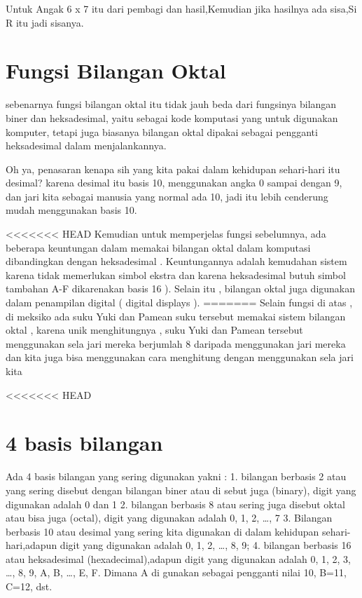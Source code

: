 Untuk Angak 6 x 7 itu dari pembagi dan hasil,Kemudian jika hasilnya ada sisa,Si R itu jadi sisanya.

\section{Fungsi Bilangan Oktal}

sebenarnya fungsi bilangan oktal itu tidak jauh beda dari fungsinya bilangan biner dan heksadesimal, yaitu sebagai kode komputasi yang untuk digunakan komputer, tetapi juga biasanya bilangan oktal dipakai sebagai pengganti heksadesimal dalam menjalankannya.

Oh ya, penasaran kenapa sih yang kita pakai dalam kehidupan sehari-hari itu desimal? karena desimal itu basis 10, menggunakan angka 0 sampai dengan 9, dan jari kita sebagai manusia yang normal ada 10, jadi itu lebih cenderung  mudah menggunakan basis 10.

<<<<<<< HEAD
Kemudian  untuk memperjelas fungsi sebelumnya, ada beberapa keuntungan dalam memakai bilangan oktal dalam komputasi dibandingkan dengan heksadesimal . Keuntungannya adalah kemudahan sistem karena tidak memerlukan simbol ekstra dan karena heksadesimal butuh simbol tambahan A-F dikarenakan basis 16 ). Selain itu , bilangan oktal juga digunakan dalam penampilan digital ( digital displays ).
=======
Selain fungsi di atas  , di meksiko ada suku Yuki dan Pamean suku tersebut memakai sistem bilangan oktal , karena unik menghitungnya , suku Yuki dan Pamean tersebut menggunakan sela jari mereka berjumlah 8 daripada menggunakan jari mereka dan kita juga bisa menggunakan cara menghitung dengan menggunakan sela jari kita 

<<<<<<< HEAD
\section{4 basis bilangan }

Ada 4 basis bilangan yang sering digunakan yakni :
1. bilangan berbasis 2 atau yang sering disebut dengan bilangan biner atau di sebut juga (binary), digit yang digunakan adalah 0 dan 1
2. bilangan berbasis 8 atau sering juga disebut oktal atau bisa juga (octal), digit yang digunakan adalah 0, 1, 2, …, 7
3. Bilangan berbasis 10 atau desimal yang sering kita digunakan di dalam kehidupan sehari-hari,adapun digit yang digunakan adalah 0, 1, 2, …, 8, 9; 
4. bilangan berbasis 16 atau heksadesimal (hexadecimal),adapun digit yang digunakan adalah 0, 1, 2, 3, …, 8, 9, A, B, …, E, F. Dimana A di gunakan sebagai pengganti nilai 10, B=11, C=12, dst.

